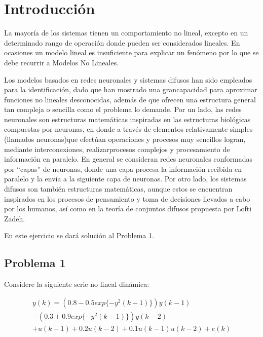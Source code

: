 \documentclass[12pt]{article}
\begin{document}

\tableofcontents

\thispagestyle{empty}
\pagebreak
\newpage
\setcounter{page}{1}


\section{Introducción}

La  mayoría  de  los  sistemas  tienen  un  comportamiento  no  lineal,  excepto  en  un determinado rango de operación donde pueden ser considerados lineales. En ocasiones un modelo lineal es insuficiente para explicar un fenómeno por lo que se debe recurrir a Modelos No Lineales.

Los modelos basados en redes neuronales y sistemas difusos han sido empleados para la identificación, dado que han mostrado una grancapacidad para aproximar funciones no lineales desconocidas, además de que ofrecen una estructura general tan compleja o sencilla como el problema lo demande. Por un lado, las redes neuronales son estructuras matemáticas inspiradas en las estructuras biológicas compuestas por neuronas, en donde a través de elementos relativamente simples (llamados neuronas)que efectúan operaciones y procesos muy sencillos logran, mediante interconexiones, realizarprocesos complejos y procesamiento de información en paralelo. En general se consideran redes neuronales conformadas por “capas” de neuronas, donde una capa procesa la información recibida en paralelo y la envía a la siguiente capa de neuronas. Por otro lado, los sistemas difusos son también estructuras matemáticas, aunque estos se encuentran inspirados en los procesos de pensamiento y toma de decisiones llevados a cabo por los humanos, así como en la teoría de conjuntos difusos propuesta por Lofti Zadeh.

En este ejercicio se dará solución al Problema 1.


\subsection{Problema 1}

Considere la siguiente serie no lineal dinámica:

\begin{align}
y(k)= (0.8 - 0.5 exp\{-y^2(k- 1)\})y(k - 1)\nonumber \\
-(0.3 + 0.9 exp\{-y^2(k - 1)\})y(k - 2)\nonumber \\
+u(k - 1) + 0.2u(k - 2) + 0.1u(k - 1)u(k - 2) + e(k)
\label{e_serie}
\end{align}
\end{document}
